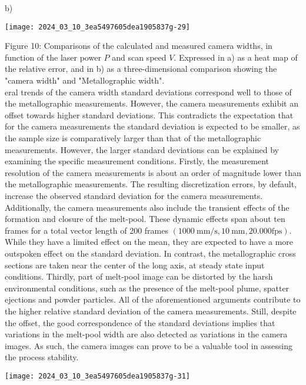 \documentclass[10pt]{article}
\begin{document}
b)

\begin{center}
\texttt{[image: 2024\_03\_10\_3ea5497605dea1905837g-29]}
\end{center}

Figure 10: Comparisons of the calculated and measured camera widths, in function of the laser power $P$ and scan speed $V$. Expressed in a) as a heat map of the relative error, and in b) as a three-dimensional comparison showing the "camera width" and "Metallographic width".\\
eral trends of the camera width standard deviations correspond well to those of the metallographic measurements. However, the camera measurements exhibit an offset towards higher standard deviations. This contradicts the expectation that for the camera measurements the standard deviation is expected to be smaller, as the sample size is comparatively larger than that of the metallographic measurements. However, the larger standard deviations can be explained by examining the specific measurement conditions. Firstly, the measurement resolution of the camera measurements is about an order of magnitude lower than the metallographic measurements. The resulting discretization errors, by default, increase the observed standard deviation for the camera measurements. Additionally, the camera measurements also include the transient effects of the formation and closure of the melt-pool. These dynamic effects span about ten frames for a total vector length of 200 frames $(1000 \mathrm{~mm} / \mathrm{s}, 10 \mathrm{~mm}, 20.000 \mathrm{fps})$. While they have a limited effect on the mean, they are expected to have a more outspoken effect on the standard deviation. In contrast, the metallographic cross sections are taken near the center of the long axis, at steady state input conditions. Thirdly, part of melt-pool image can be distorted by the harsh environmental conditions, such as the presence of the melt-pool plume, spatter ejections and powder particles. All of the aforementioned arguments contribute to the higher relative standard deviation of the camera measurements. Still, despite the offset, the good correspondence of the standard deviations implies that variations in the melt-pool width are also detected as variations in the camera images. As such, the camera images can prove to be a valuable tool in assessing the process stability.

\begin{center}
\texttt{[image: 2024\_03\_10\_3ea5497605dea1905837g-31]}
\end{center}
\end{document}
